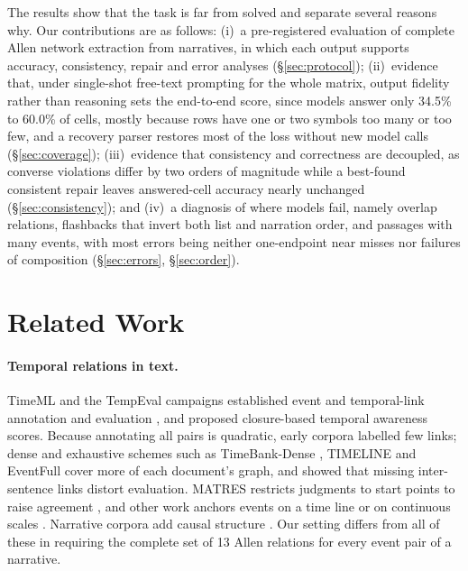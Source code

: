 \documentclass[11pt]{article}
\begin{document}
The results show that the task is far from solved and separate several reasons why. Our contributions are as follows: (i)~a pre-registered evaluation of complete Allen network extraction from narratives, in which each output supports accuracy, consistency, repair and error analyses (\S\ref{sec:protocol}); (ii)~evidence that, under single-shot free-text prompting for the whole matrix, output fidelity rather than reasoning sets the end-to-end score, since models answer only 34.5\% to 60.0\% of cells, mostly because rows have one or two symbols too many or too few, and a recovery parser restores most of the loss without new model calls (\S\ref{sec:coverage}); (iii)~evidence that consistency and correctness are decoupled, as converse violations differ by two orders of magnitude while a best-found consistent repair leaves answered-cell accuracy nearly unchanged (\S\ref{sec:consistency}); and (iv)~a diagnosis of where models fail, namely overlap relations, flashbacks that invert both list and narration order, and passages with many events, with most errors being neither one-endpoint near misses nor failures of composition (\S\ref{sec:errors}, \S\ref{sec:order}).

\section{Related Work}
\label{sec:related}

\paragraph{Temporal relations in text.}
TimeML and the TempEval campaigns established event and temporal-link annotation and evaluation \citep{pustejovsky2003timeml,uzzaman2012tempeval}, and \citet{uzzaman-allen-2011-temporal} proposed closure-based temporal awareness scores. Because annotating all pairs is quadratic, early corpora labelled few links; dense and exhaustive schemes such as TimeBank-Dense \citep{cassidy-etal-2014-annotation}, TIMELINE \citep{alsayyahi-batista-navarro-2023-timeline} and EventFull \citep{eirew-etal-2025-eventfull} cover more of each document's graph, and \citet{dsouza-ng-2014-annotating} showed that missing inter-sentence links distort evaluation. MATRES restricts judgments to start points to raise agreement \citep{ning2018multi}, and other work anchors events on a time line or on continuous scales \citep{reimers-etal-2016-temporal,vashishtha-etal-2019-fine}. Narrative corpora add causal structure \citep{mostafazadeh-etal-2016-caters,caselli-vossen-2017-event}. Our setting differs from all of these in requiring the complete set of 13 Allen relations for every event pair of a narrative.
\end{document}

